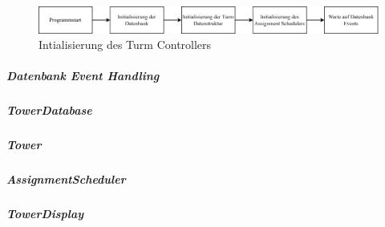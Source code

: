 \begin{figure}[ht]
  \centering
  \includegraphics[width=1\textwidth]{images/tower_controller_v4_init.png}
  \caption{Intialisierung des Turm Controllers}
  \label{fig:tower_controller_v4_init}
\end{figure}

\subparagraph{Datenbank Event Handling}

\subparagraph{TowerDatabase}

\subparagraph{Tower}

\subparagraph{AssignmentScheduler}

\subparagraph{TowerDisplay}